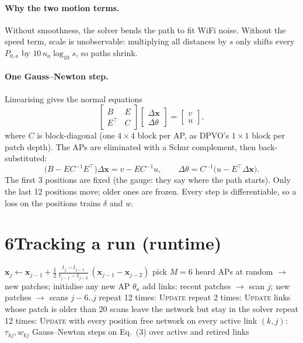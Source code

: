 \documentclass[11pt]{article}
\newcommand{\x}{\mathbf{x}}
\begin{document}
\paragraph{Why the two motion terms.} Without smoothness, the solver bends the path to fit WiFi noise.
Without the speed term, scale is unobservable: multiplying all distances by $s$ only shifts every
$P_{0,a}$ by $10\,n_a\log_{10}s$, so paths shrink.

\paragraph{One Gauss--Newton step.} Linearising gives the normal equations
\begin{equation}
\begin{bmatrix} B & E\\ E^\top & C\end{bmatrix}\begin{bmatrix}\Delta\x\\ \Delta\theta\end{bmatrix}=\begin{bmatrix} v\\ u\end{bmatrix},
\end{equation}
where $C$ is block-diagonal (one $4\times4$ block per AP, as DPVO's $1\times1$ block per patch depth).
The APs are eliminated with a Schur complement, then back-substituted:
\begin{equation}
\big(B-EC^{-1}E^\top\big)\Delta\x=v-EC^{-1}u,\qquad \Delta\theta=C^{-1}\big(u-E^\top\Delta\x\big).
\end{equation}
The first 3 positions are fixed (the gauge: they say where the path starts). Only the last 12 positions
move; older ones are frozen. Every step is differentiable, so a loss on the positions trains $\delta$ and $w$.

\section*{6\quad Tracking a run (runtime)}
\begin{algorithm}[h]
\caption{DPRO tracking, one scan at a time}
\begin{algorithmic}[1]
  \State $\x_j \gets \x_{j-1}+\tfrac12\,\tfrac{t_j-t_{j-1}}{t_{j-1}-t_{j-2}}\,(\x_{j-1}-\x_{j-2})$ 
  \State pick $M=6$ heard APs at random $\to$ new patches; initialise any new AP $\theta_a$
  \State add links: recent patches $\to$ scan $j$; new patches $\to$ scans $j-6..j$
   repeat 12 times: \textsc{Update} 
   repeat 2 times: \textsc{Update}
    \State links whose patch is older than 20 scans leave the network but stay in the solver
  \EndIf
\EndFor
\State repeat 12 times: \textsc{Update} with every position free 
\Statex
{}
  \State network on every active link $(k,j)$: $\tau_{kj}, w_{kj}$ 
   Gauss--Newton steps on Eq.~(3) over active and retired links
\EndProcedure
\end{algorithmic}
\end{algorithm}
\end{document}
